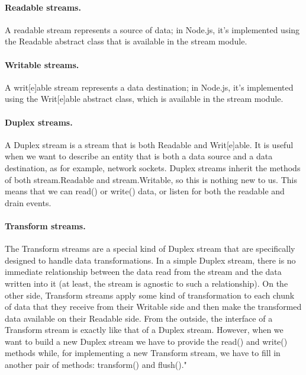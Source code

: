 \paragraph{Readable streams.}
A readable stream represents a source of data; in Node.js, it's implemented using the Readable abstract class that is available in the stream module.

\paragraph{Writable streams.}
A writ[e]able stream represents a data destination; in Node.js, it's implemented using the Writ[e]able abstract class, which is available in the stream module.

\paragraph{Duplex streams.}
A Duplex stream is a stream that is both Readable and Writ[e]able.
It is useful when we want to describe an entity that is both a data source and a data destination, as for example, network sockets. 
Duplex streams inherit the methods of both stream.Readable and stream.Writable, so this is nothing new to us. 
This means that we can read() or write() data, or listen for both the readable and drain events.

\paragraph{Transform streams.}
The Transform streams are a special kind of Duplex stream that are specifically designed to handle data transformations.
In a simple Duplex stream, there is no immediate relationship between the data read from the stream and the data written into it (at least, the stream is agnostic to such a relationship).
On the other side, Transform streams apply some kind of transformation to each chunk of data that they receive from their Writable side and then make the transformed data available on their Readable side.
From the outside, the interface of a Transform stream is exactly like that of a Duplex stream.
However, when we want to build a new Duplex stream we have to provide the read() and write() methods while, for implementing a new Transform stream, we have to fill in another pair of methods: transform() and flush()."\cite{nodejsbook}


